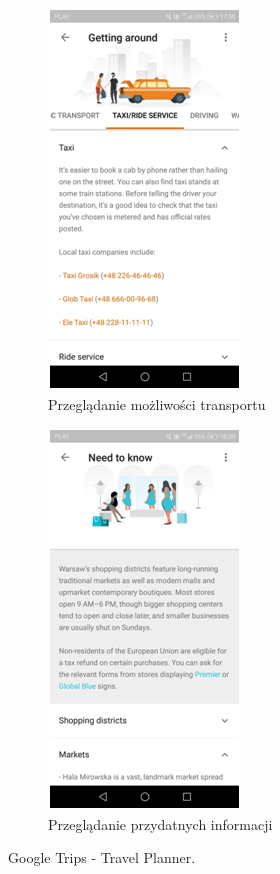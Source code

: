 \documentclass[10pt,twoside,a4paper]{report}
\begin{document}
\begin{figure}[h]
\begin{subfigure}{0.5\textwidth}
\centering
\includegraphics[width=0.9\linewidth, width=5cm]{googletrips5}
\caption{Przeglądanie możliwości transportu}
\label{fig:GTsubim5}
\end{subfigure}
\begin{subfigure}{0.5\textwidth}
\centering
\includegraphics[width=0.9\linewidth, width=5cm]{googletrips6}
\caption{Przeglądanie przydatnych informacji}
\label{fig:GTsubim6}
\end{subfigure}
\caption{Google Trips - Travel Planner.}
\label{fig:GTimage3}
\end{figure}
\end{document}
